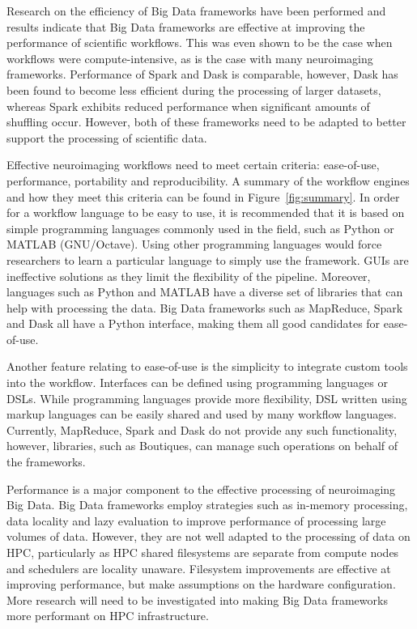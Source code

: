 \documentclass{report}
\begin{document}
        Research on the efficiency of Big Data frameworks have been performed 
        and results indicate that Big Data frameworks are effective at 
        improving the performance of scientific workflows. This was even shown
        to be the case when workflows were compute-intensive, as is the case 
        with many neuroimaging frameworks. Performance of Spark and Dask is 
        comparable, however, Dask has been found to become less efficient during 
        the processing of larger datasets, whereas Spark exhibits reduced 
        performance when significant amounts of shuffling occur. However, both
        of these frameworks need to be adapted to better support the processing
        of scientific data. 

        Effective neuroimaging workflows need to meet certain criteria: 
        ease-of-use, performance, portability and reproducibility. A summary of
        the workflow engines and how they meet this criteria can be found in Figure~\ref{fig:summary}. In order for
        a workflow language to be easy to use, it is recommended that it is 
        based on simple programming languages commonly used in the field, such 
        as Python or MATLAB (GNU/Octave). Using other programming languages 
        would force researchers to learn a particular language to simply use the
        framework. GUIs are ineffective solutions as they limit the flexibility
        of the pipeline. Moreover, languages such as Python and MATLAB have a 
        diverse set of libraries that can help with processing the data. Big
        Data frameworks such as MapReduce, Spark and Dask all have a Python 
        interface, making them all good candidates for ease-of-use.


        Another feature relating to ease-of-use is the simplicity to integrate
        custom tools into the workflow. Interfaces can be defined using programming
        languages or DSLs. While programming languages provide more flexibility,
        DSL written using markup languages can be easily shared and used by 
        many workflow languages. Currently, MapReduce, Spark and Dask do not
        provide any such functionality, however, libraries, such as Boutiques,
        can manage such operations on behalf of the frameworks.


        Performance is a major component to the effective processing of 
        neuroimaging Big Data. Big Data frameworks employ strategies such as 
        in-memory processing, data locality and lazy evaluation to improve
        performance of processing large volumes of data. However, they are not
        well adapted to the processing of data on HPC, particularly as HPC 
        shared filesystems are separate from compute nodes and schedulers are 
        locality unaware. Filesystem improvements are effective at improving 
        performance, but make assumptions on the hardware configuration. More
        research will need to be investigated into making Big Data frameworks
        more performant on HPC infrastructure.
\end{document}
